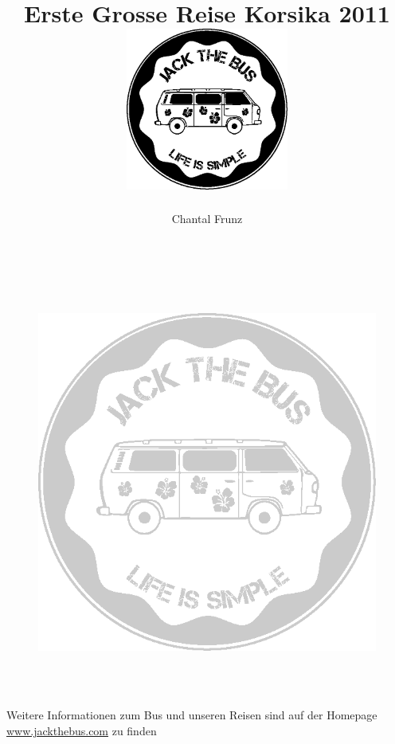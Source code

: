 \documentclass[11pt,nswissgerman]{article}
\begin{document}
\author{Chantal Frunz}
\title{\Huge Erste Grosse Reise Korsika 2011\vspace{2cm}
\includegraphics[width=0.4\textwidth]{../Bilder/Logo/Logo.png}
}
\maketitle
\vfill
\tableofcontents

\newpage



\cfoot{\thepage}

\newpage

\begin{figure}[H]
    \centering
    \includegraphics[width=\textwidth,height=14cm, keepaspectratio]{../Bilder/Logo/Logo_trans.png}
    \label{img:Logo}
\end{figure}
\vfill
    \begin{center}
        {\huge  Weitere Informationen zum Bus und unseren Reisen sind auf der Homepage {\url{www.jackthebus.com}} zu finden}
\end{center}
\end{document}
